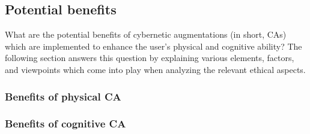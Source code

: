 \subsection{Potential benefits}
What are the potential benefits of cybernetic augmentations (in short, CAs) which are implemented to enhance the user's physical and cognitive ability? The following section answers this question by explaining various elements, factors, and viewpoints which come into play when analyzing the relevant ethical aspects. 

\subsubsection{Benefits of physical CA}


\subsubsection{Benefits of cognitive CA}
